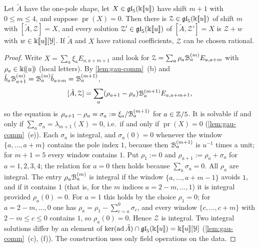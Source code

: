 
\begin{lem}[Lifting]
\label{lem:gau-lift}
Let $\tilde A$ have the one-pole shape, let $X\in\mathfrak{gl}_5(\Bbbk[\![ u ]\!])$ have shift $m+1$ with $0\leq m\leq4$, and suppose $\operatorname{pr}(X)=0$. Then there is $\mathcal Z\in\mathfrak{gl}_5(\Bbbk[\![ u ]\!])$ of shift $m$ with $[\tilde A,\mathcal Z]=X$, and every solution $\mathcal Z'\in\mathfrak{gl}_5(\Bbbk[\![ u ]\!])$ of $[\tilde A,\mathcal Z']=X$ is $\mathcal Z+w$ with $w\in\Bbbk[\![ u ]\!][\mathcal Y]$. If $\tilde A$ and $X$ have rational coefficients, $\mathcal Z$ can be chosen rational.
\end{lem}

\begin{proof}
Write $X=\sum_a\xi_aE_{a,a+m+1}$ and look for $\mathcal Z=\sum_a\rho_a\mathcal{B}^{(m)}_aE_{a,a+m}$ with $\rho_a\in\Bbbk(\!(u)\!)$ (local letters). By \cref{lem:gau-comm}~(b) and $\tilde b_a\mathcal{B}^{(m)}_{a+1}=\mathcal{B}^{(m)}_a\tilde b_{a+m}=\mathcal{B}^{(m+1)}_a$,
\[
[\tilde A,\mathcal Z]=\sum_a(\rho_{a+1}-\rho_a)\mathcal{B}^{(m+1)}_aE_{a,a+m+1},
\]
so the equation is $\rho_{a+1}-\rho_a=\sigma_a:=\xi_a/\mathcal{B}^{(m+1)}_a$ for $a\in\mathbb{Z}/5$. It is solvable if and only if $\sum_a\sigma_a=\lambda_{m+1}(X)=0$, i.e.\ if and only if $\operatorname{pr}(X)=0$ (\cref{lem:gau-comm}~(e)). Each $\sigma_a$ is integral, and $\sigma_a(0)=0$ whenever the window $\{a,\dots,a+m\}$ contains the pole index $1$, because then $\mathcal{B}^{(m+1)}_a$ is $u^{-1}$ times a unit; for $m+1=5$ every window contains $1$. Put $\rho_1:=0$ and $\rho_{a+1}:=\rho_a+\sigma_a$ for $a=1,2,3,4$; the relation for $a=0$ then holds because $\sum_a\sigma_a=0$. All $\rho_a$ are integral. The entry $\rho_a\mathcal{B}^{(m)}_a$ is integral if the window $\{a,\dots,a+m-1\}$ avoids $1$, and if it contains $1$ (that is, for the $m$ indices $a=2-m,\dots,1$) it is integral provided $\rho_a(0)=0$. For $a=1$ this holds by the choice $\rho_1=0$; for $a=2-m,\dots,0$ one has $\rho_a=\rho_1-\sum_{c=a}^0\sigma_c$, and every window $\{c,\dots,c+m\}$ with $2-m\leq c\leq0$ contains $1$, so $\rho_a(0)=0$. Hence $\mathcal Z$ is integral. Two integral solutions differ by an element of $\ker(\operatorname{ad}\tilde A)\cap\mathfrak{gl}_5(\Bbbk[\![ u ]\!])=\Bbbk[\![ u ]\!][\mathcal Y]$ (\cref{lem:gau-comm}~(c), (f)). The construction uses only field operations on the data.
\end{proof}

